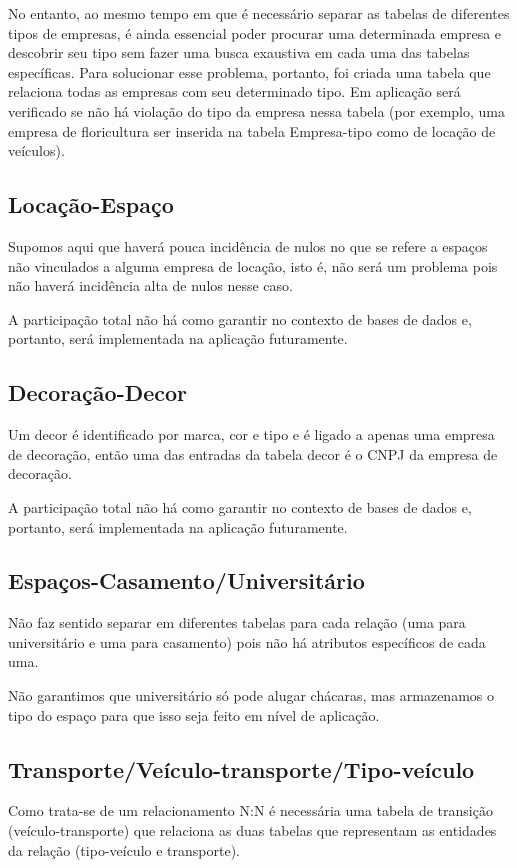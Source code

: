 \documentclass[12pt,a4paper]{article}
\begin{document}
No entanto, ao mesmo tempo em que é necessário separar as tabelas de diferentes tipos de empresas, é ainda essencial poder procurar uma determinada empresa e descobrir seu tipo sem fazer uma busca exaustiva em cada uma das tabelas específicas. Para solucionar esse problema, portanto, foi criada uma tabela que relaciona todas as empresas com seu determinado tipo. Em aplicação será verificado se não há violação do tipo da empresa nessa tabela (por exemplo, uma empresa de floricultura ser inserida na tabela Empresa-tipo como de locação de veículos).


\subsection{Locação-Espaço}
Supomos aqui que haverá pouca incidência de nulos no que se refere a espaços não vinculados a alguma empresa de locação, isto é, não será um problema pois não haverá incidência alta de nulos nesse caso.

A participação total não há como garantir no contexto de bases de dados e, portanto, será implementada na aplicação futuramente.


\subsection{Decoração-Decor}
Um decor é identificado por marca, cor e tipo e é ligado a apenas uma empresa de decoração, então uma das entradas da tabela decor é o CNPJ da empresa de decoração.

A participação total não há como garantir no contexto de bases de dados e, portanto, será implementada na aplicação futuramente.


\subsection{Espaços-Casamento/Universitário}
Não faz sentido separar em diferentes tabelas para cada relação (uma para universitário e uma para casamento) pois não há atributos específicos de cada uma.

Não garantimos que universitário só pode alugar chácaras, mas armazenamos o tipo do espaço para que isso seja feito em nível de aplicação.


\subsection{Transporte/Veículo-transporte/Tipo-veículo}
Como trata-se de um relacionamento N:N é necessária uma tabela de transição (veículo-transporte) que relaciona as duas tabelas que representam as entidades da relação (tipo-veículo e transporte).
\end{document}
